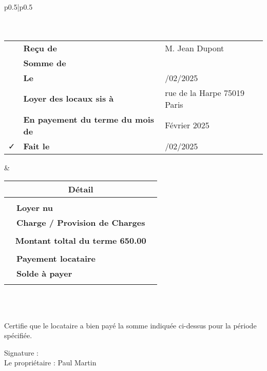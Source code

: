 \documentclass{article}
\begin{document}
\begin{tabular}{p{}|p{}}
	\hline 	
	\\
		\\
	\hline 
	\\
	\begin{tabular}{c>{\raggedleft\arraybackslash}p{}>{\raggedright\arraybackslash}p{}}
		\faFile{} &  \textbf{Reçu de} & M. Jean Dupont\\
		\faMoney & 	\textbf{Somme de}	 & 650.00 \EURdig\\
		\faCalendar & \textbf{Le} & 05/02/2025\\
		\faMapMarker & \textbf{Loyer des locaux sis à } & 6 rue de la Harpe 75019 Paris\\
		\faPencil & \textbf{En payement du terme du mois de} & Février 2025\\
		\faCheck & \textbf{Fait le} & 07/02/2025\\
	\end{tabular}
	& \setlength{\arrayrulewidth}{2pt} %
	\begin{tabular}{c>{\raggedleft\arraybackslash}p{}>{\raggedright\arraybackslash}p{}}	
		\multicolumn{3}{c}{\bf Détail}\\
		\hline \\
		\faHome{} & \textbf{Loyer nu} & 580.0 \EURdig	\\
		\faBolt{} & \textbf{Charge / Provision de Charges} &  70.0 \EURdig	\\
		\\
		\multicolumn{3}{c}{\bf Montant toltal du terme 650.00 \EURdig }\\
		\hline \\
		\faMoney{} & \textbf{Payement locataire} & 600.00 \EURdig	\\
		\faExclamationTriangle{} & \textbf{Solde à payer} &  50.00 \EURdig	\\
		&\\
	\end{tabular}\\
	\hline
    \\
    \hline
\end{tabular}






\vspace{1cm}

\noindent
Certifie que le locataire a bien payé la somme indiquée ci-dessus pour la période spécifiée.

\vspace{2cm}

\noindent
Signature : \\
Le propriétaire : Paul Martin
\end{document}
